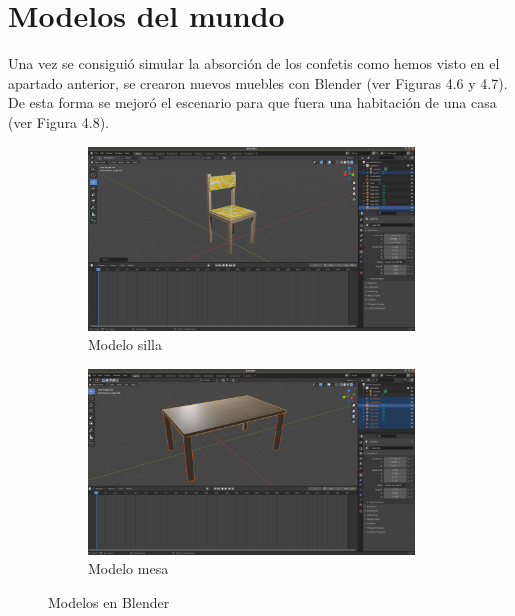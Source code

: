 \section{Modelos del mundo}
Una vez se consiguió simular la absorción de los confetis como hemos visto en el apartado anterior, se crearon nuevos muebles con Blender (ver Figuras 4.6 y 4.7). De esta forma se mejoró el escenario para que fuera una habitación de una casa (ver Figura 4.8).
\begin{figure}[H]
  \begin{subfigure}[b]{0.5\textwidth}
  \centering
    \includegraphics[width=0.95\textwidth, height=0.6\textwidth]{chapters/images/silla.png}
    \caption{Modelo silla}
    \label{fig:f1}
  \end{subfigure}
  \hfill
  \begin{subfigure}[b]{0.5\textwidth}
  \centering
    \includegraphics[width=0.95\textwidth, height=0.6\textwidth]{chapters/images/mesa.png}
	\caption{Modelo mesa}    
    \label{fig:f2}
 
  \end{subfigure}
  \caption{Modelos en Blender}
\end{figure}

